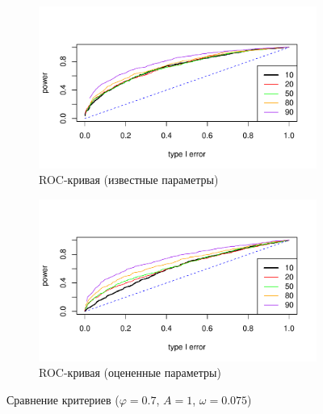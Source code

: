 \documentclass[specialist,
substylefile = spbu.rtx,
               subf,href,colorlinks=true,12pt]{disser}
\theoremstyle{definition}
\begin{document}
\begin{figure}[h!]
\begin{subfigure}[t]{0.5\textwidth}
		\label{fig:type1error_phi7est}
	\end{subfigure}
	\bigskip
	\begin{subfigure}[t]{0.5\textwidth}
		\centering
		\includegraphics[width=\textwidth]{img/roc_phi7_omega0075.pdf}
		\caption{ROC-кривая (известные параметры)}
		\label{fig:roc_phi7_omega0075}
	\end{subfigure}\hspace{\fill}
	\begin{subfigure}[t]{0.5\textwidth}
		\centering
		\includegraphics[width=\textwidth]{img/roc_phi7est_omega0075.pdf}
		\caption{ROC-кривая (оцененные параметры)}
		\label{fig:roc_phi7est_omega0075}
	\end{subfigure}
	\caption{Сравнение критериев ($\varphi=0.7$, $A=1$, $\omega=0.075$)}
	\label{fig:est_comp}
\end{figure}
\end{document}
